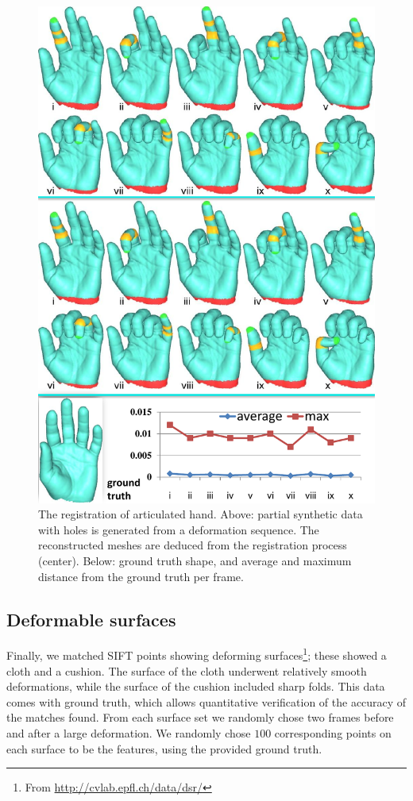 \begin{figure}[h]
\centering
  \includegraphics[width=0.95\linewidth]{figures/3DHand.pdf}
  \caption{The registration of articulated hand.
  Above: partial synthetic data with holes is generated from a deformation sequence.
  The reconstructed meshes are deduced from the registration process (center).
  Below: ground truth shape, and average and maximum distance from the ground truth per frame.}
\label{fig:3DHand}
\end{figure}

\subsection{Deformable surfaces}
\label{subsec:2DDeformable}

Finally, we matched SIFT points showing deforming surfaces\footnote{From \url{http://cvlab.epfl.ch/data/dsr/}}; these showed a cloth and a cushion.
The surface of the cloth underwent relatively smooth deformations, while the surface of the cushion included sharp folds.
This data comes with ground truth, which allows quantitative verification of the accuracy of the matches found.
From each surface set we randomly chose two frames before and after a large deformation.
We randomly chose $100$ corresponding points on each surface to be the features, using the provided ground truth.

